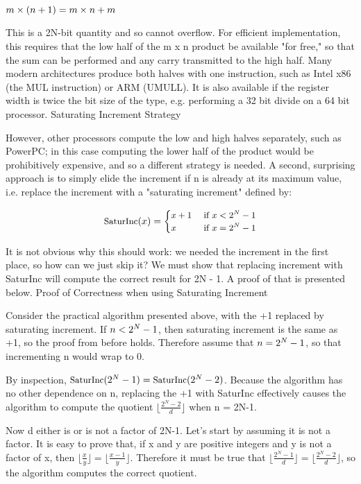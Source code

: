 $ \small m \times (n+1) = m \times n + m $

This is a 2N-bit quantity and so cannot overflow. For efficient implementation, this requires that the low half of the m x n product be available "for free," so that the sum can be performed and any carry transmitted to the high half. Many modern architectures produce both halves with one instruction, such as Intel x86 (the MUL instruction) or ARM (UMULL). It is also available if the register width is twice the bit size of the type, e.g. performing a 32 bit divide on a 64 bit processor.
Saturating Increment Strategy

However, other processors compute the low and high halves separately, such as PowerPC; in this case computing the lower half of the product would be prohibitively expensive, and so a different strategy is needed. A second, surprising approach is to simply elide the increment if n is already at its maximum value, i.e. replace the increment with a "saturating increment" defined by:

$$ \small \text{SaturInc}(x) = \begin{cases} x+1 & \text{ if } x < 2^N-1 \\ x & \text{ if } x = 2^N-1 \end{cases} $$

It is not obvious why this should work: we needed the increment in the first place, so how can we just skip it? We must show that replacing increment with SaturInc will compute the correct result for 2N - 1. A proof of that is presented below.
Proof of Correctness when using Saturating Increment

Consider the practical algorithm presented above, with the +1 replaced by saturating increment. If $ \small n < 2^N-1 $, then saturating increment is the same as +1, so the proof from before holds. Therefore assume that $ \small n = 2^N-1 $, so that incrementing n would wrap to 0.

By inspection, $ \small \text{SaturInc}(2^N - 1) = \text{SaturInc}(2^N - 2) $. Because the algorithm has no other dependence on n, replacing the +1 with SaturInc effectively causes the algorithm to compute the quotient $ \lfloor \frac {2^N - 2} d \rfloor $ when n = 2N-1.

Now d either is or is not a factor of 2N-1. Let's start by assuming it is not a factor. It is easy to prove that, if x and y are positive integers and y is not a factor of x, then $ \lfloor \frac x y \rfloor = \lfloor \frac {x-1} y \rfloor $. Therefore it must be true that $ \lfloor \frac {2^N - 1} d \rfloor = \lfloor \frac {2^N - 2} d \rfloor $, so the algorithm computes the correct quotient.

